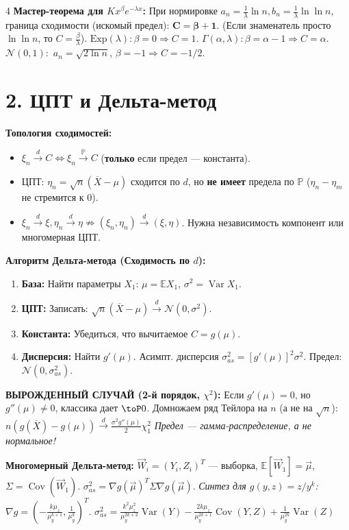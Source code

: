 \documentclass[8pt, a4paper, landscape]{extarticle}
\newcommand{\E}{\mathbb{E}}
\renewcommand{\P}{\mathbb{P}}
\newcommand{\N}{\mathcal{N}}
\DeclareMathOperator{\Var}{Var}
\DeclareMathOperator{\Cov}{Cov}
\begin{document}
\begin{multicols*}{4}
\textbf{Мастер-теорема для $K x^\beta e^{-\lambda x}$:}
При нормировке $a_n \!=\! \frac{1}{\lambda}\ln n, b_n \!=\! \frac{1}{\lambda}\ln\ln n$, граница сходимости (искомый предел): $\mathbf{C = \beta + 1}$. (Если знаменатель просто $\ln \ln n$, то $C \!=\! \frac{\beta}{\lambda}$).
$\text{Exp}(\lambda): \beta=0 \Rightarrow C=1$. 
$\Gamma(\alpha, \lambda): \beta=\alpha-1 \Rightarrow C=\alpha$. 
$\N(0,1):$ $a_n=\sqrt{2\ln n}$, $\beta=-1 \Rightarrow C=-1/2$.

\section*{2. ЦПТ и Дельта-метод}
\textbf{Топология сходимостей:}
\begin{itemize}
    \item $\xi_n \xrightarrow{d} C \iff \xi_n \xrightarrow{\P} C$ (\textbf{только} если предел --- константа).
    \item ЦПТ: $\eta_n = \sqrt{n}(\overline{X} - \mu)$ сходится по $d$, но \textbf{не имеет} предела по $\P$ ($\eta_n - \eta_m$ не стремится к $0$).
    \item $\xi_n \xrightarrow{d} \xi, \eta_n \xrightarrow{d} \eta \not\Rightarrow (\xi_n, \eta_n) \xrightarrow{d} (\xi, \eta)$. Нужна независимость компонент или многомерная ЦПТ.
\end{itemize}

\textbf{Алгоритм Дельта-метода (Сходимость по $d$):}
\begin{enumerate}
    \item \textbf{База:} Найти параметры $X_1$: $\mu = \E X_1$, $\sigma^2 = \Var X_1$.
    \item \textbf{ЦПТ:} Записать: $\sqrt{n}(\overline{X} - \mu) \xrightarrow{d} \N(0, \sigma^2)$.
    \item \textbf{Константа:} Убедиться, что вычитаемое $C = g(\mu)$.
    \item \textbf{Дисперсия:} Найти $g'(\mu)$. Асимпт. дисперсия $\sigma_{as}^2 = [g'(\mu)]^2 \sigma^2$. Предел: $\N(0, \sigma_{as}^2)$.
\end{enumerate}

\textbf{ВЫРОЖДЕННЫЙ СЛУЧАЙ (2-й порядок, $\chi^2$):}
Если $g'(\mu)=0$, но $g''(\mu)\ne 0$, классика дает $\toP 0$. Домножаем ряд Тейлора на $n$ (а не на $\sqrt{n}$):
$ n(g(\overline{X}) - g(\mu)) \xrightarrow{d} \frac{\sigma^2 g''(\mu)}{2} \chi^2_1 $
\textit{Предел — гамма-распределение, а не нормальное!}

\textbf{Многомерный Дельта-метод:} $\vec{W}_i=(Y_i, Z_i)^T$ --- выборка, $\E[\vec{W}_1]=\vec{\mu}$, $\Sigma = \Cov(\vec{W}_1)$. $\sigma_{as}^2 = \nabla g(\vec{\mu})^T \Sigma \nabla g(\vec{\mu})$.
\textit{Синтез для $g(y,z) = z/y^k$:} $\nabla g = \left(-\frac{k\mu_z}{\mu_y^{k+1}}, \frac{1}{\mu_y^k}\right)^T$.
$ \sigma^2_{as} \!=\! \frac{k^2 \mu_z^2}{\mu_y^{2k+2}} \Var(Y) - \frac{2k \mu_z}{\mu_y^{2k+1}} \Cov(Y, Z) + \frac{1}{\mu_y^{2k}} \Var(Z) $


\end{multicols*}
\end{document}
